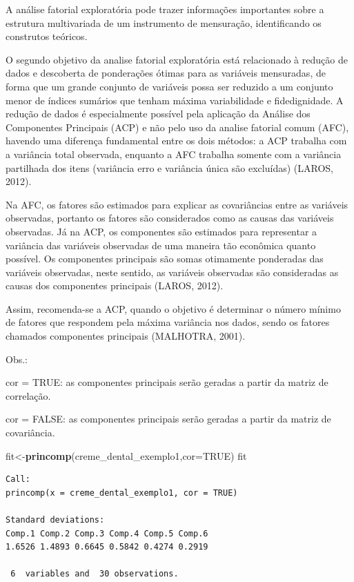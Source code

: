 \documentclass[12pt,brazil,oneside]{book}
\newenvironment{Shaded}{\begin{snugshade}}{\end{snugshade}}
\newcommand{\DataTypeTok}[1]{\textcolor[rgb]{0.13,0.29,0.53}{#1}}
\newcommand{\KeywordTok}[1]{\textcolor[rgb]{0.13,0.29,0.53}{\textbf{#1}}}
\newcommand{\NormalTok}[1]{#1}
\newcommand{\OtherTok}[1]{\textcolor[rgb]{0.56,0.35,0.01}{#1}}
\begin{document}
A análise fatorial exploratória pode trazer informações importantes sobre a estrutura multivariada de um instrumento de mensuração, identificando os construtos teóricos.

O segundo objetivo da analise fatorial exploratória está relacionado à redução de dados e descoberta de ponderações ótimas para as variáveis mensuradas, de forma que um grande conjunto de variáveis possa ser reduzido a um conjunto menor de índices sumários que tenham máxima variabilidade e fidedignidade. A redução de dados é especialmente possível pela aplicação da Análise dos Componentes Principais (ACP) e não pelo uso da analise fatorial comum (AFC), havendo uma diferença fundamental entre os dois métodos: a ACP trabalha com a variância total observada, enquanto a AFC trabalha somente com a variância partilhada dos itens (variância erro e variância única são excluídas) (LAROS, 2012).

Na AFC, os fatores são estimados para explicar as covariâncias entre as variáveis observadas, portanto os fatores são considerados como as causas das variáveis observadas. Já na ACP, os componentes são estimados para representar a variância das variáveis observadas de uma maneira tão econômica quanto possível. Os componentes principais são somas otimamente ponderadas das variáveis observadas, neste sentido, as variáveis observadas são consideradas as causas dos componentes principais (LAROS, 2012).

Assim, recomenda-se a ACP, quando o objetivo é determinar o número mínimo de fatores que respondem pela máxima variância nos dados, sendo os fatores chamados componentes principais (MALHOTRA, 2001).

Obs.:

cor = TRUE: as componentes principais serão geradas a partir da matriz de correlação.

cor = FALSE: as componentes principais serão geradas a partir da matriz de covariância.

\begin{Shaded}
\begin{Highlighting}[]
\NormalTok{fit<-}\KeywordTok{princomp}\NormalTok{(creme_dental_exemplo1,}\DataTypeTok{cor=}\OtherTok{TRUE}\NormalTok{)}
\NormalTok{fit}
\end{Highlighting}
\end{Shaded}

\begin{verbatim}
Call:
princomp(x = creme_dental_exemplo1, cor = TRUE)

Standard deviations:
Comp.1 Comp.2 Comp.3 Comp.4 Comp.5 Comp.6 
1.6526 1.4893 0.6645 0.5842 0.4274 0.2919 

 6  variables and  30 observations.
\end{verbatim}
\end{document}

